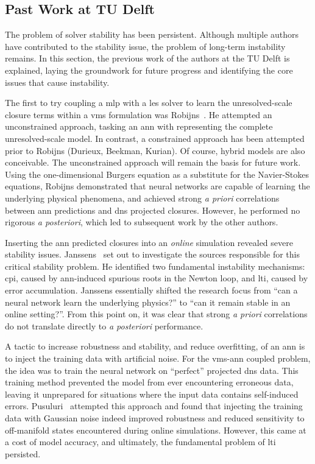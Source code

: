 \subsection{Past Work at TU Delft} \label{subsec:past_work}

The problem of solver stability has been persistent.
Although multiple authors have contributed to the stability issue, the problem of long-term instability remains.
In this section, the previous work of the authors at the TU Delft is explained, laying the groundwork for future progress and identifying the core issues that cause instability.

The first to try coupling a \gls{mlp} with a \gls{les} solver to learn the unresolved-scale closure terms within a \gls{vms} formulation was Robijns~\cite{Robijns2019}.
He attempted an unconstrained approach, tasking an \gls{ann} with representing the complete unresolved-scale model.
In contrast, a constrained approach has been attempted prior to Robijns (Durieux, Beekman, Kurian).
Of course, hybrid models are also conceivable.
The unconstrained approach will remain the basis for future work.
Using the one-dimensional Burgers equation as a substitute for the Navier-Stokes equations, Robijns demonstrated that neural networks are capable of learning the underlying physical phenomena, and achieved strong \emph{a priori} correlations between \gls{ann} predictions and \gls{dns} projected closures.
However, he performed no rigorous \emph{a posteriori}, which led to subsequent work by the other authors.

Inserting the \gls{ann} predicted closures into an \emph{online} simulation revealed severe stability issues.
Janssens~\cite{Janssens2019} set out to investigate the sources responsible for this critical stability problem.
He identified two fundamental instability mechanisms: \gls{cpi}, caused by \gls{ann}-induced spurious roots in the Newton loop, and \gls{lti}, caused by error accumulation.
Janssens essentially shifted the research focus from ``can a neural network learn the underlying physics?'' to ``can it remain stable in an online setting?''.
From this point on, it was clear that strong \emph{a priori} correlations do not translate directly to \emph{a posteriori} performance.


A tactic to increase robustness and stability, and reduce overfitting, of an \gls{ann} is to inject the training data with artificial noise.
For the \gls{vms}-\gls{ann} coupled problem, the idea was to train the neural network on ``perfect'' projected \gls{dns} data.
This training method prevented the model from ever encountering erroneous data, leaving it unprepared for situations where the input data contains self-induced errors.
Pusuluri~\cite{Pusuluri2020} attempted this approach and found that injecting the training data with Gaussian noise indeed improved robustness and reduced sensitivity to off-manifold states encountered during online simulations.
However, this came at a cost of model accuracy, and ultimately, the fundamental problem of \gls{lti} persisted.

